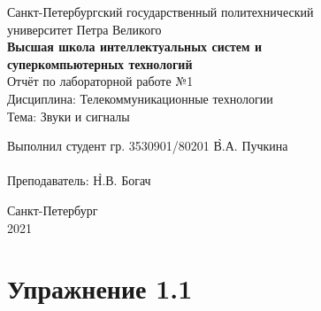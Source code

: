 \documentclass[a4paper, 14pt]{extarticle}
\begin{document}
    \begin{center}
        \begin{center}
            \hfill \break
            \normalsize{Санкт-Петербургский государственный политехнический}\\
            \normalsize{университет Петра Великого}\\
            \hfill \break
            \normalsize{\textbf{Высшая школа интеллектуальных систем и}}\\
            \normalsize{\textbf{суперкомпьютерных технологий}}\\
            \hfill \break
            \hfill \break
            \hfill \break
            \normalsize{Отчёт по лабораторной работе №1}\\
            \normalsize{Дисциплина: Телекоммуникационные технологии}\\
            \normalsize{Тема: Звуки и сигналы}\\
        \end{center}
        \hfill \break
        \hfill \break
        \hfill \break
        \hfill \break
        \hfill \break
        \hfill \break
        \hfill \break
        \hfill \break
        \hfill \break
        \hfill \break
        \begin{tabbing}
            Выполнил студент гр. 3530901/80201 \`В.А. Пучкина\\
            \\
            Преподаватель: \`Н.В. Богач\\
        \end{tabbing}
        \hfill \break
        \hfill \break
        \hfill \break
        \hfill \break
        \begin{center}
            Санкт-Петербург\\
            2021
        \end{center}
        \thispagestyle{empty}
    \end{center}

    \newpage
    \tableofcontents

    \newpage
    \listoffigures

    \newpage
    \lstlistoflistings

    \newpage
    \section{Упражнение 1.1}
    \label{sec:task1}
\end{document}
